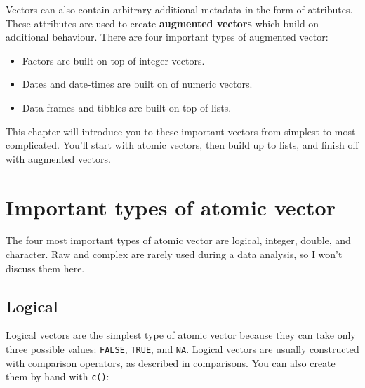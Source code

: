 \documentclass[]{book}
\newenvironment{Shaded}{\begin{snugshade}}{\end{snugshade}}
\newcommand{\KeywordTok}[1]{\textcolor[rgb]{0.13,0.29,0.53}{\textbf{{#1}}}}
\newcommand{\DecValTok}[1]{\textcolor[rgb]{0.00,0.00,0.81}{{#1}}}
\newcommand{\StringTok}[1]{\textcolor[rgb]{0.31,0.60,0.02}{{#1}}}
\newcommand{\CommentTok}[1]{\textcolor[rgb]{0.56,0.35,0.01}{\textit{{#1}}}}
\newcommand{\OtherTok}[1]{\textcolor[rgb]{0.56,0.35,0.01}{{#1}}}
\newcommand{\NormalTok}[1]{{#1}}
\providecommand{\tightlist}{%
  \setlength{\itemsep}{0pt}\setlength{\parskip}{0pt}}
\begin{document}
Vectors can also contain arbitrary additional metadata in the form of
attributes. These attributes are used to create \textbf{augmented
vectors} which build on additional behaviour. There are four important
types of augmented vector:

\begin{itemize}
\tightlist
\item
  Factors are built on top of integer vectors.
\item
  Dates and date-times are built on of numeric vectors.
\item
  Data frames and tibbles are built on top of lists.
\end{itemize}

This chapter will introduce you to these important vectors from simplest
to most complicated. You'll start with atomic vectors, then build up to
lists, and finish off with augmented vectors.

\section{Important types of atomic
vector}\label{important-types-of-atomic-vector}

The four most important types of atomic vector are logical, integer,
double, and character. Raw and complex are rarely used during a data
analysis, so I won't discuss them here.

\subsection{Logical}\label{logical}

Logical vectors are the simplest type of atomic vector because they can
take only three possible values: \texttt{FALSE}, \texttt{TRUE}, and
\texttt{NA}. Logical vectors are usually constructed with comparison
operators, as described in \protect\hyperlink{comparisons}{comparisons}.
You can also create them by hand with \texttt{c()}:

\begin{Shaded}
\end{Shaded}
\end{document}

